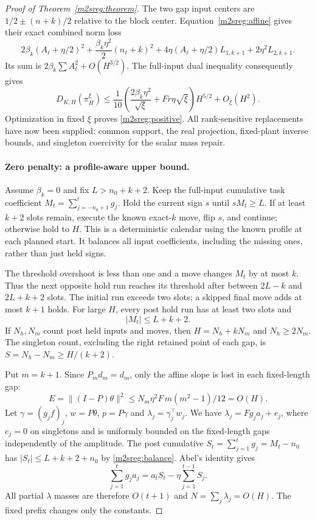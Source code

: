 \documentclass[11pt]{article}
\begin{document}
\begin{proof}[Proof of Theorem~\ref{m2sreg:theorem}]
The two gap input centers are $1/2\pm(n+k)/2$ relative to the
block center. Equation~\eqref{m2sreg:affine} gives their exact
combined norm loss
\[
2\beta_k(A_\ell+\eta/2)^2+
 \frac{\beta_k\eta^2}{2}(n_\ell+k)^2+
4\eta(A_\ell+\eta/2)L_{1,k+1}+2\eta^2L_{2,k+1}.
\]
Its sum is $2\beta_k\sum A_\ell^2+O(H^{3/2})$.
The full-input dual inequality consequently gives
\begin{equation}\label{m2sreg:symmetricupper}
D_{K,H}(\pi_H^\xi)\le
\frac1{10}\left(\frac{2\beta_k\eta^2}{\sqrt\xi}
 +Fr\eta\sqrt\xi\right)H^{5/2}+O_\xi(H^2).
\end{equation}
Optimization in fixed $\xi$ proves \eqref{m2sreg:positive}.
All rank-sensitive replacements have now been supplied: common
support, the real projection, fixed-plant inverse bounds, and
singleton coercivity for the scalar mass repair.

\paragraph{Zero penalty: a profile-aware upper bound.}
Assume $\beta_k=0$ and fix $L>n_0+k+2$.
Keep the full-input cumulative task coefficient
$M_t=\sum_{j=-n_0+1}^t g_j$.
Hold the current sign $s$ until $sM_t\ge L$.
If at least $k+2$ slots remain, execute the known exact-$k$ move,
flip $s$, and continue; otherwise hold to $H$.
This is a deterministic calendar using the known profile at each
planned start. It balances all input coefficients, including the
missing ones, rather than just held signs.

The threshold overshoot is less than one and a move changes $M_t$
by at most $k$. Thus the next opposite hold run reaches its threshold
after between $2L-k$ and $2L+k+2$ slots.
The initial run exceeds two slots; a skipped final move adds at most
$k+1$ holds. For large $H$, every post hold run has at least two
slots and
\begin{equation}\label{m2sreg:balance}
|M_t|\le L+k+2 .
\end{equation}
If $N_h,N_m$ count post held inputs and moves, then
$H=N_h+kN_m$ and $N_h\ge2N_m$.
The singleton count, excluding the right retained point of each gap,
is $S=N_h-N_m\ge H/(k+2)$.

Put $m=k+1$. Since $P_md_m=d_m$, only the affine slope is lost
in each fixed-length gap:
\begin{equation}\label{m2sreg:slopeloss}
E=\|(I-P)\theta\|^2\le
N_m\eta^2F\,m(m^2-1)/12=O(H).
\end{equation}
Let $\gamma=(g_jf)_j$, $w=P\theta$, $p=P\gamma$ and
$\lambda_j=\gamma_j^\top w_j$.
We have $\lambda_j=Fg_ja_j+e_j$, where $e_j=0$ on singletons
and is uniformly bounded on the fixed-length gaps independently
of the amplitude. The post cumulative $S_t=\sum_{j=1}^tg_j=M_t-n_0$
has $|S_t|\le L+k+2+n_0$ by \eqref{m2sreg:balance}. Abel's identity gives
\[
\sum_{j=1}^t g_ja_j=a_tS_t-\eta\sum_{j=1}^{t-1}S_j .
\]
All partial $\lambda$ masses are therefore $O(t+1)$ and
$N=\sum_j\lambda_j=O(H)$. The fixed prefix changes only the constants.


\end{proof}
\end{document}

